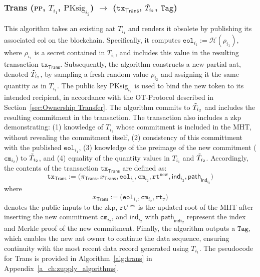 \subsubsection{\textsf{Trans} (\textsc{pp}, $T_{i_1}$,  $\text{PKsig}_{i_2}$) $\rightarrow$ ($\texttt{tx}_{\textsf{Trans}}$, $\Tilde{T}_{i_2}$, $\texttt{Tag}$)}

This algorithm takes an existing \gls{aat} $T_{i_1}$ and renders it obsolete by publishing its associated \gls{eol} on the blockchain. Specifically, it computes $\texttt{eol}_{i_1} := \mathcal{H}(\rho_{i_1})$, where $\rho_{i_1}$ is a secret contained in $T_{i_1}$, and includes this value in the resulting transaction $\texttt{tx}_{\textsf{Trans}}$.
Subsequently, the algorithm constructs a new partial \gls{aat}, denoted $\Tilde{T}_{i_2}$, by sampling a fresh random value $\rho_{i_2}$ and assigning it the same quantity as in $T_{i_1}$. The public key $\text{PKsig}_{i_2}$ is used to bind the new token to its intended recipient, in accordance with the \textsf{OT-Protocol} described in Section~\ref{sec:Ownership Transfer}. The algorithm commits to $\Tilde{T}_{i_2}$ and includes the resulting commitment in the transaction.
The transaction also includes a \gls{zkp} demonstrating:
(1)  knowledge of $T_{i_1}$ whose commitment is included in the \textsf{MHT}, without revealing the commitment itself,
(2) consistency of this committment with the published $\texttt{eol}_{i_1}$,
(3) knowledge of the preimage of the new commitment ($\texttt{cm}_{i_2}$) to $\Tilde{T}_{i_2}$, and
(4) equality of the quantity values in $T_{i_1}$ and $\Tilde{T}_{i_2}$.
Accordingly, the contents of the transaction $\texttt{tx}_{\textsf{Trans}}$ are defined as:
\[
\texttt{tx}_{\textsf{Trans}} := \big(\pi_{\textsf{Trans}}, x_{\textsf{Trans}}, \texttt{eol}_{i_1}, \texttt{cm}_{i_2}, \texttt{rt}^{\text{new}}, \mathsf{ind}_{i_2}, \mathsf{path}_{\mathsf{ind}_{i_2}} \big)
\]
where 
\[
x_\textsf{Trans} := \big(\texttt{eol}_{i_1}, \texttt{cm}_{i_2}, \texttt{rt}_\tau \big)
\]
denotes the public inputs to the \gls{zkp}, $\texttt{rt}^{\text{new}}$ is the updated root of the \textsf{MHT} after inserting the new commitment $\texttt{cm}_{i_2}$, and $\mathsf{ind}_{i_2}$ with $\mathsf{path}_{\mathsf{ind}{i_2}}$ represent the index and Merkle proof of the new commitment.
Finally, the algorithm outputs a $\texttt{Tag}$, which enables the new \gls{aat} owner to continue the data sequence, ensuring continuity with the most recent data record generated using $T_{i_1}$. The pseudocode for \textsf{Trans} is provided in Algorithm~\ref{alg:trans} in Appendix~\ref{a_ch:zupply_algorithms}.




